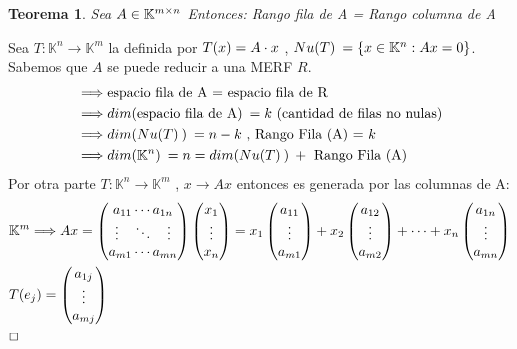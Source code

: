 \documentclass[]{article}
\newtheorem{theorem}{Teorema}
\newenvironment{proof}{\noindent{\bf Prueba:}}{$\hfill \Box$ \vspace{10pt}}
\newcommand{\K}{
    \mathbb{K}
}
\newcommand{\ida}{\Longrightarrow}
\begin{document}
\begin{theorem}
    Sea $A \in \text{$\mathbb{K}^{m \times n}$}$ Entonces: Rango fila de A = Rango columna de A
\end{theorem}
\begin{proof}
    Sea $T:\K^{n}\rightarrow\K^{m}$ la \tl definida por $\text{$T({x})$}=A \cdot x$ , $\N=\conjunto{x \in \K^n : Ax=0}$.\\
    Sabemos que $A$ se puede reducir a una MERF $R$.
    \begin{align*}
        &\ida \text{espacio fila de A = espacio fila de R}\\
        &\ida \dm{\text{espacio fila de A}} = k \text{ (cantidad de filas no nulas)}\\
        &\ida \dm{\N}=n-k \text{ , Rango Fila (A) = } k\\ 
        &\ida \dm{\K^n}=n = \dm{\N}+ \text{ Rango Fila (A)}
    \end{align*}
    Por otra parte $T:\K^{n}\rightarrow\K^{m}$ , $x \rightarrow Ax$ entonces \I es generada por las columnas de A:
    \begin{align*}
        &\K^m \ida Ax =
        \begin{pmatrix} a_{11} \cdots a_{1n} \\ \vdots\quad\ddots\quad \vdots \\ a_{m1} \cdots a_{mn} \end{pmatrix}
        \begin{pmatrix} x_1 \\ \vdots \\ x_n \end{pmatrix} =
        x_1 \begin{pmatrix} a_{11} \\ \vdots \\ a_{m1} \end{pmatrix}+
        x_2 \begin{pmatrix} a_{12} \\ \vdots \\ a_{m2} \end{pmatrix}+
        \cdots +
        x_n \begin{pmatrix} a_{1n} \\ \vdots \\ a_{mn} \end{pmatrix}\\
        & \T{e_j}= \begin{pmatrix} a_{1j} \\ \vdots \\ a_{mj} \end{pmatrix}

\end{align*}
\end{proof}
\end{document}
